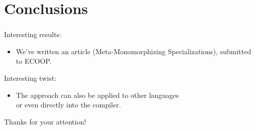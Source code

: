 \section{Conclusions}\label{sec:conclusions}


\begin{frame}
	\frametitle{\secname}

	\Large Interesting results:
	\normalsize
	\begin{itemize}
		\item We've written an article (\alert{Meta-Monomorphizing Specializations}), submitted to \alert{ECOOP}.
	\end{itemize}

	\bigskip

	\Large Interesting twist:
	\normalsize
	\begin{itemize}
		\item The approach can also be applied to other \alert{languages} %
		      \\or even directly into the \alert{compiler}. %
	\end{itemize}

\end{frame}


\begin{frame}
	\begin{center}
		\huge Thanks for your attention!
	\end{center}
\end{frame}